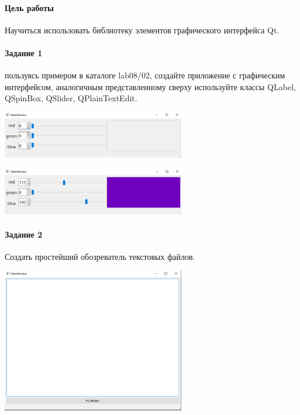\paragraph{Цель работы}
Научиться использовать библиотеку элементов графического интерфейса Qt.

\paragraph{Задание 1}
пользуясь примером в каталоге lab08/02, создайте приложение с графическим интерфейсом, аналогичным представленному сверху
используйте классы QLabel, QSpinBox, QSlider, QPlainTextEdit.




\includegraphics[width=0.6\textwidth]{scr1.PNG}

\includegraphics[width=0.6\textwidth]{scr2.PNG}

\paragraph{Задание 2}
Создать простейший обозреватель текстовых файлов.




\includegraphics[width=0.6\textwidth]{scr3.PNG}

